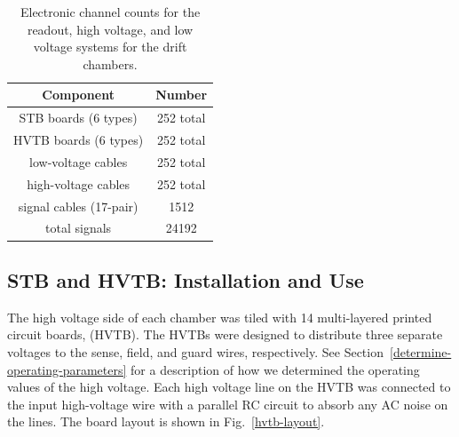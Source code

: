 \begin{table}[htbp]
\begin{center}
\begin{tabular} {||c|c||} \hline \hline
{\bf Component}           & {\bf Number} \\ \hline
STB boards (6 types)      & 252 total \\ \hline
HVTB boards (6 types)     & 252 total \\ \hline
low-voltage cables        & 252 total  \\ \hline
high-voltage cables       & 252 total  \\ \hline
signal cables (17-pair)   & 1512 \\ \hline
total signals             & 24192 \\ \hline \hline
\end{tabular}
\caption{\small{Electronic channel counts for the readout, high voltage,
and low voltage systems for the drift chambers.}}
\label{electronic-components}
\end{center}
\end{table}

\subsection{STB and HVTB: Installation and Use}
\label{stb-hvtb-installation}

The high voltage side of each chamber was tiled with 14  multi-layered printed circuit 
boards, (HVTB). The HVTBs were designed to distribute three
separate voltages to the sense, field, and guard wires, respectively.  See
Section~\ref{determine-operating-parameters} for a 
description of how we determined the operating values of the high voltage.  
Each high voltage line on the HVTB was connected to the 
input high-voltage wire with a parallel RC circuit to absorb any AC noise on
the lines.  The board layout is shown in Fig.~\ref{hvtb-layout}.

